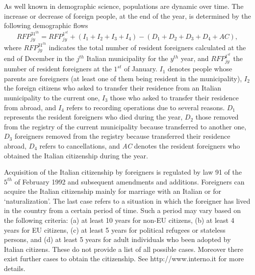\documentclass[10pt] {article}
\theoremstyle{definition}
\theoremstyle{plain}
\begin{document}

As well known in demographic science, populations are dynamic over time.  The increase or decrease of foreign people, at the end of the year, is determined by the following demographic flows 
$$
RFP^{31^{th}}_{jy} = RFP^{1^{st}}_{jy} + (I_1 + I_2 + I_3+ I_4) - (D_1 + D_2 + D_3 + D_4 + AC), 
$$ 
where $RFP^{31^{th}}_{jy}$ indicates the total number of resident foreigners calculated at the end of December in the $j^{th}$ Italian municipality for the $y^{th}$ year, and $RFP^{1^{st}}_{jy}$ the number of resident foreigners at the $1^{st}$ of January. $I_{1}$ denotes people whose parents are foreigners (at least one of them being resident in the municipality), $I_{2}$ the foreign citizens who asked to transfer their residence from an Italian municipality to the current one, $I_{3}$ those who asked to transfer their residence from abroad, and $I_{4}$ refers to recording operations due to several reasons. $D_{1}$ represents the resident foreigners who died during the year, $D_{2}$ those removed from the registry of the current municipality because transferred to another one, $D_{3}$ foreigners removed from the registry because transferred their residence abroad, $D_{4}$ refers to cancellations, and \textit{AC} denotes the resident foreigners who obtained the Italian citizenship during the year. 

Acquisition of the Italian citizenship by foreigners is regulated by law 91 of the $5^{th}$ of February 1992 and subsequent amendments and additions. Foreigners can acquire the Italian citizenship mainly for marriage with an Italian or for `naturalization'. The last case refers to a situation in which the foreigner has lived in the country from a certain period of time. Such a period may vary based on the following criteria: (a) at least 10 years for non-EU citizens, (b) at least 4 years for EU citizens, (c) at least 5 years for political refugees or stateless persons, and (d) at least 5 years for adult individuals who been adopted by Italian citizens. These do not provide a list of all possible cases. Moreover there exist further cases to obtain the citizenship. See http://www.interno.it for more details. 
\end{document}
